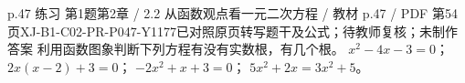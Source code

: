 \par\noindent\begin{minipage}{\linewidth}
\begin{bankitem}{p.47 练习 第1题}{第2章 / 2.2 从函数观点看一元二次方程 / 教材 p.47 / PDF 第54页}{XJ-B1-C02-PR-P047-Y1177}{已对照原页转写题干及公式；待教师复核；未制作答案}
利用函数图象判断下列方程有没有实数根，有几个根。
$x^2-4x-3=0$；
$2x(x-2)+3=0$；
$-2x^2+x+3=0$；
$5x^2+2x=3x^2+5$。
\end{bankitem}
\end{minipage}\par\medskip
